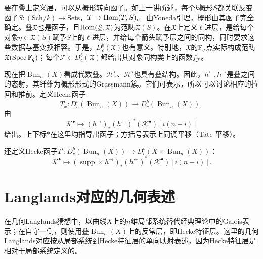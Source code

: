 要在叠上定义层，可以从概形转向函子。如上一讲所述，每个$k$概形$S$都关联反变函子$\underline S:(\mathrm{Sch}/k)\to\mathrm{Sets}$，$T\mapsto\operatorname{Hom}(T,S)$。
由Yoneda引理，概形由其函子完全确定。叠$\mathfrak X$也是函子，且$\operatorname{Hom}(\underline S,\mathfrak X)$为范畴$\mathfrak X(S)$。在$\mathfrak X$上定义$\ell$进层，是给每个对象$\eta\in\mathfrak X(S)$赋予$S$上的$\ell$进层，并给每个箭头赋予层之间的同构，同时要求这些数据与基变换相容。于是，$D^b_c(\mathfrak X)$也有意义。特别地，$\mathfrak X$的$\mathbb{F}_q$点实际构成范畴$\mathfrak X(\operatorname{Spec}\mathbb{F}_q)$；每个$\mathcal F\in D^b_c(\mathfrak X)$都给出其对象同构类上的函数$f_{\mathcal F}$。

现在把$\operatorname{Bun}_n(X)$看成代数叠。$\mathcal H_x^i$、$\mathcal H^i$也具有叠结构。因此，$h^\leftarrow,h^\rightarrow$是叠之间的态射，其纤维为概形形式的Grassmann簇。它们可表示，所以可以讨论相应的拉回和推前。定义Hecke函子
\[T_x^i:D^b_c(\operatorname{Bun}_n(X))\to D^b_c(\operatorname{Bun}_n(X)),\]
由
\[\mathcal K^\bullet\longmapsto(h^\rightarrow)_*(h^\leftarrow)^*(\mathcal K^\bullet)[i(n-i)]\]
给出。上下标$*$在这里均指导出函子；方括号表示上同调平移（Tate 平移）。

还定义Hecke函子$T^i:D^b_c(\operatorname{Bun}_n(X))\to D^b_c(X\times\operatorname{Bun}_n(X))$：
\[\mathcal K^\bullet\longmapsto(\operatorname{supp}\times h^\rightarrow)_*(h^\leftarrow)^*(\mathcal K^\bullet)[i(n-i)].\]
\section{Langlands对应的几何表述}\label{L12S3}
在几何Langlands猜想中，以曲线$X$上的$n$维局部系统替代经典理论中的Galois表示；在自守一侧，则使用叠$\operatorname{Bun}_n(X)$上的反常层，即Hecke特征层。这里的几何Langlands对应按从局部系统到Hecke特征层的单向映射表述，因为Hecke特征层是相对于局部系统定义的。

